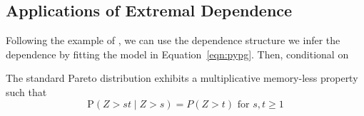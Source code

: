 \begin{comment}
                \item need to make a statement harkening back to the fact this is a simulation of
                    storm parameters sampled via latin hypercube, so the definition of 'return period'
                    in this context is suspect.
            \end{itemize}
            \item Given shaky conception of multivariate return period, we might consider alternative 
                definitions more relevant to an inundation field.
            \begin{itemize}
                \item Total Inundation field?  (some univariate transformation?)
                \item number of locales under significant flooding?
            \end{itemize}
        \end{itemize}
        \item Application results
    \end{itemize}
\end{comment}

\subsection{Applications of Extremal Dependence}
Following the example of \cite{trubey:pg}, we can use the dependence structure we infer the dependence
    by fitting the model in Equation~\eqref{eqn:pypg}.  Then, conditional on



The standard Pareto distribution exhibits a multiplicative memory-less property such that
\[
\text{P}(Z > st \mid Z > s) = P(Z > t)\text{ for }s,t \geq 1
\]

